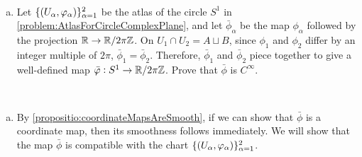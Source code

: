 \begin{problem}
	$ \ $
	\label{problem:quotientOfRByZIsCircle}
	\begin{enumerate}[(a)]
		\item Let $ \{(U_\alpha,\varphi_\alpha)\}_{\alpha=1}^{2} $ be the atlas of the circle $ S^1 $ in \autoref{problem:AtlasForCircleComplexPlane}, and let $ \bar{\phi}_\alpha $ be the map $ \phi_\alpha $ followed by the projection $ \mathbb{R} \to \mathbb{R}/2\pi\mathbb{Z} $. On $ U_1\cap U_2  = A \sqcup B$, since $ \phi_1 $ and $ \phi_2 $ differ by an integer multiple of $ 2\pi $, $ \bar{\phi}_1 = \bar{\phi}_2 $. Therefore, $ \bar{\phi}_1 $ and $ \bar{\phi}_2 $ piece together to give a well-defined map $ \bar{\varphi}:S^1 \to \mathbb{R}/2\pi\mathbb{Z} $. Prove that $ \bar{\phi} $ is $ C^\infty $.
	\end{enumerate}
\end{problem}
\begin{solution}
	$ \ $
	\begin{enumerate}[(a)]
		\item By \autoref{propositio:coordinateMapsAreSmooth}, if we can show that $ \bar{\phi} $ is a coordinate map, then its smoothness follows immediately. We will show that the map $ \bar{\phi} $ is compatible with the chart $ \{(U_\alpha,\varphi_\alpha)\}_{\alpha=1}^2 $.
	\end{enumerate}
\end{solution}


